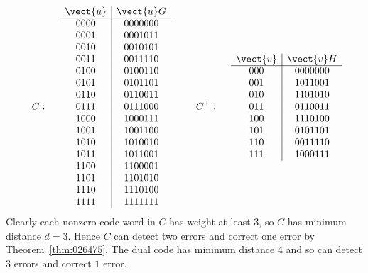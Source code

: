 \begin{equation*}
	\begin{array}{rrc|c}
	&& \vect{u} & \vect{u}G \\ \cline{3-4}
	&& 0000 & 0000000 \\
	&& 0001 & 0001011 \\
	&& 0010 & 0010101 \\
	&& 0011 & 0011110 \\
	&& 0100 & 0100110 \\ 
	&& 0101 & 0101101 \\
	&& 0110 & 0110011 \\
	C: && 0111 & 0111000 \\
	&& 1000 & 1000111 \\
	&& 1001 & 1001100 \\
	&& 1010 & 1010010 \\
	&& 1011 & 1011001 \\
	&& 1100 & 1100001 \\
	&& 1101 & 1101010 \\
	&& 1110 & 1110100 \\
	&& 1111 & 1111111 
	\end{array} 
        \quad \quad 
    \begin{array}{rrc|c}
	&& \vect{v} & \vect{v}H \\ \cline{3-4}
	&& 000 & 0000000 \\
	&& 001 & 1011001 \\
	&& 010 & 1101010 \\
	C^\perp: && 011 & 0110011 \\
	&& 100 & 1110100 \\ 
	&& 101 & 0101101 \\
	&& 110 & 0011110 \\
	&& 111 & 1000111 
	\end{array}
\end{equation*}
Clearly each nonzero code word in $C$ has weight at least $3$, so $C$ has minimum distance $d = 3$. Hence $C$ can detect two errors and correct one error by Theorem~\ref{thm:026475}. The dual code has minimum distance $4$ and so can detect $3$ errors and correct $1$ error.

